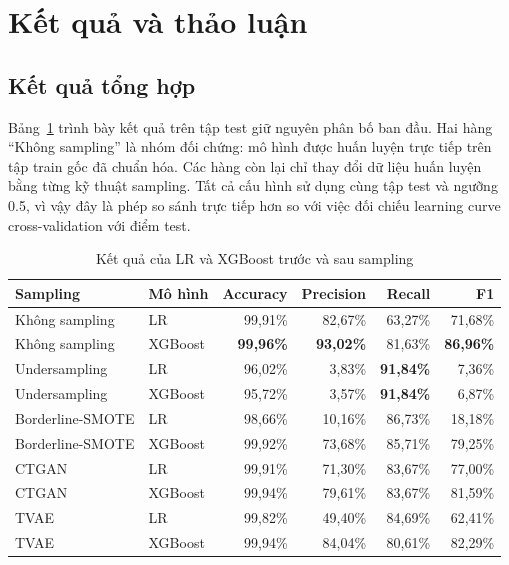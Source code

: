 \documentclass[12pt,a4paper]{article}
\begin{document}
\section{Kết quả và thảo luận}

\subsection{Kết quả tổng hợp}

Bảng~\ref{tab:results} trình bày kết quả trên tập test giữ nguyên phân bố ban đầu. Hai hàng ``Không sampling'' là nhóm đối chứng: mô hình được huấn luyện trực tiếp trên tập train gốc đã chuẩn hóa. Các hàng còn lại chỉ thay đổi dữ liệu huấn luyện bằng từng kỹ thuật sampling. Tất cả cấu hình sử dụng cùng tập test và ngưỡng 0.5, vì vậy đây là phép so sánh trực tiếp hơn so với việc đối chiếu learning curve cross-validation với điểm test.

\begin{table}[H]
    \centering
    \small
    \setlength{\tabcolsep}{4.2pt}
    \begin{tabular}{llrrrr}
        \toprule
        \textbf{Sampling} & \textbf{Mô hình} & \textbf{Accuracy} & \textbf{Precision} & \textbf{Recall} & \textbf{F1} \\
        \midrule
        Không sampling & LR & 99,91\% & 82,67\% & 63,27\% & 71,68\% \\
        Không sampling & XGBoost & \textbf{99,96\%} & \textbf{93,02\%} & 81,63\% & \textbf{86,96\%} \\
        \midrule
        Undersampling & LR & 96,02\% & 3,83\% & \textbf{91,84\%} & 7,36\% \\
        Undersampling & XGBoost & 95,72\% & 3,57\% & \textbf{91,84\%} & 6,87\% \\
        \midrule
        Borderline-SMOTE & LR & 98,66\% & 10,16\% & 86,73\% & 18,18\% \\
        Borderline-SMOTE & XGBoost & 99,92\% & 73,68\% & 85,71\% & 79,25\% \\
        \midrule
        CTGAN & LR & 99,91\% & 71,30\% & 83,67\% & 77,00\% \\
        CTGAN & XGBoost & 99,94\% & 79,61\% & 83,67\% & 81,59\% \\
        \midrule
        TVAE & LR & 99,82\% & 49,40\% & 84,69\% & 62,41\% \\
        TVAE & XGBoost & 99,94\% & 84,04\% & 80,61\% & 82,29\% \\
        \bottomrule
    \end{tabular}
    \caption{Kết quả của LR và XGBoost trước và sau sampling}
    \label{tab:results}
\end{table}
\end{document}
